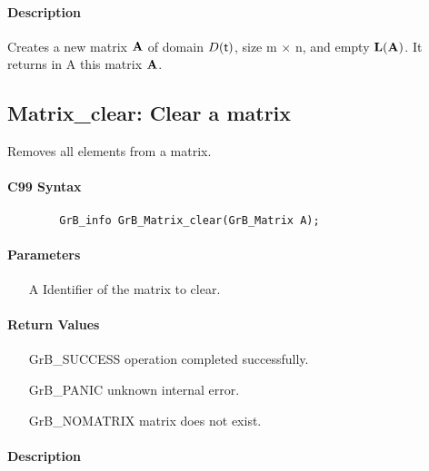 \paragraph{Description}

Creates a new matrix ${\bf A}$ of domain $D({\sf t})$, size {\sf m $\times$ n}, and
empty $\bold{L}({\bf A})$. It returns in {\sf A} this matrix ${\bf A}$.

\subsection{{\sf Matrix\_clear}: Clear a matrix}

Removes all elements from a matrix.

\paragraph{C99 Syntax}

\begin{verbatim}
        GrB_info GrB_Matrix_clear(GrB_Matrix A);
\end{verbatim}

\paragraph{Parameters}

\begin{itemize}[leftmargin=1.1in]
    \item[{\sf A}] Identifier of the matrix to clear.
\end{itemize}

\paragraph{Return Values}

\begin{itemize}[leftmargin=2.1in]
\item[{\sf GrB\_SUCCESS}]   operation completed successfully.
\item[{\sf GrB\_PANIC}]     unknown internal error.
\item[{\sf GrB\_NOMATRIX}]  matrix does not exist.
\end{itemize}

\paragraph{Description}

